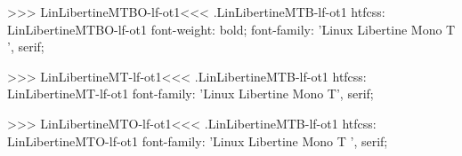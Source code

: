 {{{>>>
\<LinLibertineMTBO-lf-ot1\><<<
.LinLibertineMTB-lf-ot1
htfcss:  LinLibertineMTBO-lf-ot1  font-weight: bold; font-family: 'Linux Libertine Mono T ', serif;

>>>
\<LinLibertineMT-lf-ot1\><<<
.LinLibertineMTB-lf-ot1
htfcss:  LinLibertineMT-lf-ot1  font-family: 'Linux Libertine Mono T', serif;

>>>
\<LinLibertineMTO-lf-ot1\><<<
.LinLibertineMTB-lf-ot1
htfcss:  LinLibertineMTO-lf-ot1  font-family: 'Linux Libertine Mono T ', serif;

}}}

